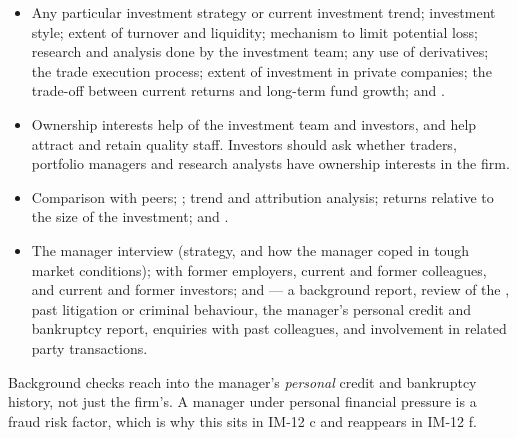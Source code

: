 \begin{itemize}
\item {} Any particular investment strategy or current investment
trend; investment style; extent of turnover and liquidity; mechanism to limit
potential loss; research and analysis done by the investment team; any use of
derivatives; the trade execution process; extent of investment in private
companies; the trade-off between current returns and long-term fund growth; and
.
\item {} Ownership interests help  of the
investment team and investors, and help attract and retain quality staff.
Investors should ask whether traders, portfolio managers and research analysts
have ownership interests in the firm.
\item {} Comparison with peers; ; trend and attribution analysis; returns relative to the size of
the investment; and .
\item {} The manager interview (strategy, and how the
manager coped in tough market conditions);  with former
employers, current and former colleagues, and current and former investors; and
 --- a background report, review of the ,
past litigation or criminal behaviour, the manager's personal credit and
bankruptcy report, enquiries with past colleagues, and involvement in related
party transactions.
\end{itemize}

\begin{imtrapbox}[breakable=false,title={The personal credit report is not an accident}]
Background checks reach into the manager's \emph{personal} credit and bankruptcy
history, not just the firm's. A manager under personal financial pressure is a
fraud risk factor, which is why this sits in IM-12 c and reappears in IM-12 f.
\end{imtrapbox}


